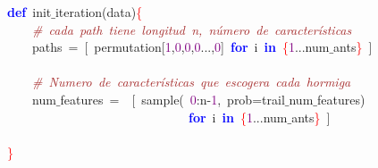 \noindent
\mbox{}\textbf{\textcolor{Blue}{def}}\ init$\_$iteration\textcolor{BrickRed}{(}data\textcolor{BrickRed}{)}\textcolor{Red}{\{} \\
\mbox{}\ \ \ \ \textit{\textcolor{Brown}{\#\ cada\ path\ tiene\ longitud\ n,\ número\ de\ características}} \\
\mbox{}\ \ \ \ paths\ \textcolor{BrickRed}{=}\ \textcolor{BrickRed}{[}\ permutation\textcolor{BrickRed}{[}\textcolor{Purple}{1}\textcolor{BrickRed}{,}\textcolor{Purple}{0}\textcolor{BrickRed}{,}\textcolor{Purple}{0}\textcolor{BrickRed}{,}\textcolor{Purple}{0}\textcolor{BrickRed}{...,}\textcolor{Purple}{0}\textcolor{BrickRed}{]}\ \textbf{\textcolor{Blue}{for}}\ i\ \textbf{\textcolor{Blue}{in}}\ \textcolor{Red}{\{}\textcolor{Purple}{1}\textcolor{BrickRed}{...}num$\_$ants\textcolor{Red}{\}}\ \textcolor{BrickRed}{]} \\
\mbox{} \\
\mbox{}\ \ \ \ \textit{\textcolor{Brown}{\#\ Numero\ de\ características\ que\ escogera\ cada\ hormiga}} \\
\mbox{}\ \ \ \ num$\_$features\ \textcolor{BrickRed}{=}\ \ \textcolor{BrickRed}{[}\ sample\textcolor{BrickRed}{(}\ \textcolor{Purple}{0}\textcolor{BrickRed}{:}n\textcolor{BrickRed}{-}\textcolor{Purple}{1}\textcolor{BrickRed}{,}\ prob\textcolor{BrickRed}{=}trail$\_$num$\_$features\textcolor{BrickRed}{)} \\
\mbox{}\ \ \ \ \ \ \ \ \ \ \ \ \ \ \ \ \ \ \ \ \ \ \ \ \ \ \ \ \ \textbf{\textcolor{Blue}{for}}\ i\ \textbf{\textcolor{Blue}{in}}\ \textcolor{Red}{\{}\textcolor{Purple}{1}\textcolor{BrickRed}{...}num$\_$ants\textcolor{Red}{\}}\ \textcolor{BrickRed}{]} \\
\mbox{} \\
\mbox{}\textcolor{Red}{\}} \\
\mbox{}
